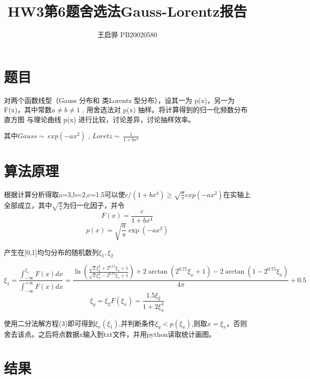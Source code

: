 \documentclass{article}
\title{\songti \zihao{2}\bfseries HW3第6题舍选法Gauss-Lorentz报告}
\author{王启骅 PB20020580}
\begin{document}
	\maketitle
	\section{题目}
对两个函数线型（Gauss 分布和 类Lorentz 型分布），设其一为 p(x)，另一为
F(x)，其中常数$ a\neq b\neq 1 $ , 用舍选法对 p(x) 抽样。将计算得到的归一化频数分布直方图
与理论曲线 p(x) 进行比较，讨论差异，讨论抽样效率。


其中$ Gauss\sim \ exp(-ax^2) $ , $ Loretz \sim \ \frac{1}{1+bx^4} $
	\section{算法原理}
根据计算分析得取a=3,b=2,c=1.5可以使$  c/(1+bx^4)\ge \sqrt{\frac{a}{\pi}}exp(-ax^2) $在实轴上全部成立，其中$ \sqrt{\frac{a}{\pi}} $为归一化因子，并令
\begin{equation}
	F(x)=\frac{c}{1+bx^4}
\end{equation}
\begin{equation}
	p(x)=\sqrt{\frac{a}{\pi}}\exp(-ax^2)
\end{equation}


产生在[0,1]均匀分布的随机数列$ \xi_1,\xi_2 $


\begin{equation}
	\xi_1=\frac{\int_{-\infty}^{\xi_x}F(x)dx}{\int_{-\infty}^{+\infty}F(x)dx}=
	\frac{\ln(\frac{\sqrt{2}\xi_x^2+2^{0.75}\xi_x+1}{\sqrt{2}\xi_x^2-2^{0.75}\xi_x+1})+2\arctan(2^{0.75}\xi_x+1)-2\arctan(1-2^{0.75}\xi_x)}{4\pi}+0.5
\end{equation}
\begin{equation}
	\xi_y=\xi_2F(\xi_x)=\frac{1.5\xi_2}{1+2\xi_x^4}
\end{equation}


使用二分法解方程(3)即可得到$ \xi_x(\xi_1) $,并判断条件$ \xi_y<p(\xi_x) $,则取$ x=\xi_x $，否则舍去该点。之后将点数据x输入到txt文件，并用python读取统计画图。


	
	\section{结果}
	
\end{document}
